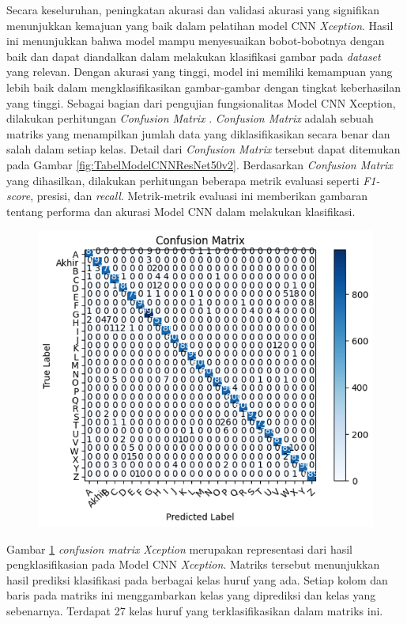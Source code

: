 Secara keseluruhan, peningkatan akurasi dan validasi akurasi yang signifikan menunjukkan kemajuan yang baik dalam pelatihan model CNN \textit{Xception}. Hasil ini menunjukkan bahwa model mampu menyesuaikan bobot-bobotnya dengan baik dan dapat diandalkan dalam melakukan klasifikasi gambar pada \textit{dataset} yang relevan. Dengan akurasi yang tinggi, model ini memiliki kemampuan yang lebih baik dalam mengklasifikasikan gambar-gambar dengan tingkat keberhasilan yang tinggi. Sebagai bagian dari pengujian fungsionalitas Model CNN Xception, dilakukan perhitungan \textit{Confusion Matrix} . \textit{Confusion Matrix} adalah sebuah matriks yang menampilkan jumlah data yang diklasifikasikan secara benar dan salah dalam setiap kelas. Detail dari \textit{Confusion Matrix} tersebut dapat ditemukan pada Gambar \ref{fig:TabelModelCNNResNet50v2}. Berdasarkan \textit{Confusion Matrix} yang dihasilkan, dilakukan perhitungan beberapa metrik evaluasi seperti \textit{F1-score}, presisi, dan \textit{recall}. Metrik-metrik evaluasi ini memberikan gambaran tentang performa dan akurasi Model CNN dalam melakukan klasifikasi.

\begin{figure}[!hbt]
	\centering
	\includegraphics[width=0.7\linewidth]{gambar/bener/ConfusionMatrix_ModelXception.png}
	\label{fig:confusionmatrixModelCNNXception}
\end{figure}

Gambar \ref{fig:confusionmatrixModelCNNXception} \textit{confusion matrix} \textit{Xception}  merupakan representasi dari hasil pengklasifikasian pada Model CNN \textit{Xception}. Matriks tersebut menunjukkan hasil prediksi klasifikasi pada berbagai kelas huruf yang ada. Setiap kolom dan baris pada matriks ini menggambarkan kelas yang diprediksi dan kelas yang sebenarnya. Terdapat 27 kelas huruf yang terklasifikasikan dalam matriks ini.

